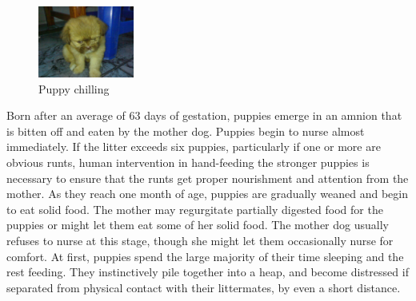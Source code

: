 \documentclass[a4paper, 12pt, notitlepage]{report}
\begin{document}
\begin{figure} 
    
    \label{fig:puppy}
    
    \begin{center} 
    
        \vspace{-25px} 
        
        \includegraphics[width=0.28\textwidth]{images/puppy.jpg}
        
    \end{center}
  
    \caption{\small Puppy chilling}
    
    \vspace{-10px}

\end{figure}


Born after an average of 63 days of gestation, puppies emerge in an amnion that is bitten off and eaten by the mother dog. Puppies begin to nurse almost immediately. If the litter exceeds six puppies, particularly if one or more are obvious runts, human intervention in hand-feeding the stronger puppies is necessary to ensure that the runts get proper nourishment and attention from the mother. As they reach one month of age, puppies are gradually weaned and begin to eat solid food. The mother may regurgitate partially digested food for the puppies or might let them eat some of her solid food. The mother dog usually refuses to nurse at this stage, though she might let them occasionally nurse for comfort. At first, puppies spend the large majority of their time sleeping and the rest feeding. They instinctively pile together into a heap, and become distressed if separated from physical contact with their littermates, by even a short distance.
\end{document}
